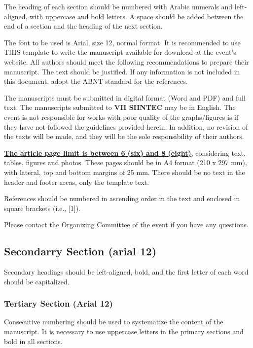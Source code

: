 \documentclass[
	article,			%
	12pt,				%
	oneside,			%
	a4paper,			%
	english,			%
	brazil,				%
	sumario=tradicional
	]{abntex2}
\begin{document}
The heading of each section should be numbered with Arabic numerals and left-aligned, with uppercase and bold letters. A space should be added between the end of a section and the heading of the next section.

The font to be used is Arial, size 12, normal format. It is recommended to use THIS template to write the manuscript available for download at the event's website. All authors should meet the following recommendations to prepare their manuscript. The text should be justified. If any information is not included in this document, adopt the ABNT standard for the references.

The manuscripts must be submitted in digital format (Word and PDF) and full text. The manuscripts submitted to \textbf{VII SIINTEC} may be in English. The event is not responsible for works with poor quality of the graphs/figures is if they have not followed the guidelines provided herein. In addition, no revision of the texts will be made, and they will be the sole responsibility of their authors.

\textbf{\underline{The article page limit is between 6 (six) and 8 (eight)}}, considering text, tables, figures and photos. These pages should be in A4 format (210 x 297 mm), with lateral, top and bottom margins of 25 mm. There should be no text in the header and footer areas, only the template text.

References should be numbered in ascending order in the text and enclosed in square brackets (i.e., [1]).

Please contact the Organizing Committee of the event if you have any questions.



\subsection{\textbf{Secondarry Section (arial 12)}}

Secondary headings should be left-aligned, bold, and the first letter of each word should be capitalized.

\subsubsection{\textbf{Tertiary Section (Arial 12)}}

Consecutive numbering should be used to systematize the content of the manuscript. It is necessary to use uppercase letters in the primary sections and bold in all sections.
\end{document}
